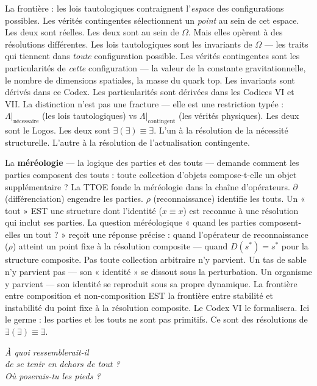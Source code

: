 \documentclass[10pt, openany, oneside]{book}
\begin{document}
La frontière : les lois tautologiques contraignent l'\textit{espace} des configurations possibles. Les vérités contingentes sélectionnent un \textit{point} au sein de cet espace. Les deux sont réelles. Les deux sont au sein de $\Omega$. Mais elles opèrent à des résolutions différentes. Les lois tautologiques sont les invariants de $\Omega$ --- les traits qui tiennent dans \textit{toute} configuration possible. Les vérités contingentes sont les particularités de \textit{cette} configuration --- la valeur de la constante gravitationnelle, le nombre de dimensions spatiales, la masse du quark top. Les invariants sont dérivés dans ce Codex. Les particularités sont dérivées dans les Codices VI et VII. La distinction n'est pas une fracture --- elle est une restriction typée : $\Lambda|_{\text{nécessaire}}$ (les lois tautologiques) vs $\Lambda|_{\text{contingent}}$ (les vérités physiques). Les deux sont le Logos. Les deux sont $\exists(\exists) \equiv \exists$. L'un à la résolution de la nécessité structurelle. L'autre à la résolution de l'actualisation contingente.

La \textbf{méréologie} --- la logique des parties et des touts --- demande comment les parties composent des touts : toute collection d'objets compose-t-elle un objet supplémentaire ? La TTOE fonde la méréologie dans la chaîne d'opérateurs. $\partial$ (différenciation) engendre les parties. $\rho$ (reconnaissance) identifie les touts. Un « tout » EST une structure dont l'identité ($x \equiv x$) est reconnue à une résolution qui inclut ses parties. La question méréologique « quand les parties composent-elles un tout ? » reçoit une réponse précise : quand l'opérateur de reconnaissance ($\rho$) atteint un point fixe à la résolution composite --- quand $D(s^*) = s^*$ pour la structure composite. Pas toute collection arbitraire n'y parvient. Un tas de sable n'y parvient pas --- son « identité » se dissout sous la perturbation. Un organisme y parvient --- son identité se reproduit sous sa propre dynamique. La frontière entre composition et non-composition EST la frontière entre stabilité et instabilité du point fixe à la résolution composite. Le Codex VI le formalisera. Ici le germe : les parties et les touts ne sont pas primitifs. Ce sont des résolutions de $\exists(\exists) \equiv \exists$.

\vspace{1.5em}

\begin{center}
    \itshape
    À quoi ressemblerait-il\\
    de se tenir en dehors de tout ?\\
    Où poserais-tu les pieds ?
\end{center}
\end{document}
